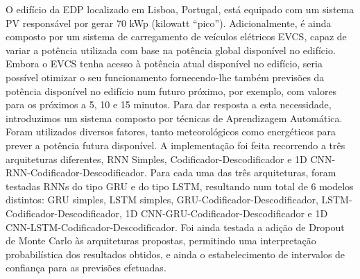 \noindent O edifício da \ac{EDP} localizado em Lisboa, Portugal, está equipado com um sistema \ac{PV} responsável por gerar 70 kWp (kilowatt “pico”). Adicionalmente, é ainda composto por um sistema de carregamento de veículos elétricos \ac{EVCS}, capaz de variar a potência utilizada com base na potência global disponível no edifício. Embora o \ac{EVCS} tenha acesso à potência atual disponível no edifício, seria possível otimizar o seu funcionamento fornecendo-lhe também previsões da potência disponível no edifício num futuro próximo, por exemplo, com valores para os próximos a 5, 10 e 15 minutos. Para dar resposta a esta necessidade, introduzimos um sistema composto por técnicas de Aprendizagem Automática. Foram utilizados diversos fatores, tanto meteorológicos como energéticos para prever a potência futura disponível. A implementação foi feita recorrendo a três arquiteturas diferentes, \ac{RNN} Simples, Codificador-Descodificador e \ac{1D CNN}-\ac{RNN}-Codificador-Descodificador. Para cada uma das três arquiteturas, foram testadas \ac{RNN}s do tipo \ac{GRU} e do tipo \ac{LSTM}, resultando num total de 6 modelos distintos: \ac{GRU} simples, \ac{LSTM} simples, \ac{GRU}-Codificador-Descodificador, \ac{LSTM}-Codificador-Descodificador, \ac{1D CNN}-\ac{GRU}-Codificador-Descodificador e \ac{1D CNN}-\ac{LSTM}-Codificador-Descodificador. Foi ainda testada a adição de Dropout de Monte Carlo às arquiteturas propostas, permitindo uma interpretação probabilística dos resultados obtidos, e ainda o estabelecimento de intervalos de confiança para as previsões efetuadas. 